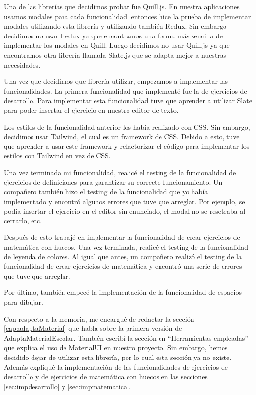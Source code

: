 Una de las librerías que decidimos probar fue Quill.js. En nuestra aplicaciones usamos modales para cada funcionalidad, entonces hice la prueba de implementar modales utilizando esta librería y utilizando también Redux. Sin embargo decidimos no usar Redux ya que encontramos una forma más sencilla de implementar los modales en Quill. Luego decidimos no usar Quill.js ya que encontramos otra librería llamada Slate.js que se adapta mejor a nuestras necesidades.

Una vez que decidimos que librería utilizar, empezamos a implementar las funcionalidades. La primera funcionalidad que implementé fue la de ejercicios de desarrollo. Para implementar esta funcionalidad tuve que aprender a utilizar Slate para poder insertar el ejercicio en nuestro editor de texto.

Los estilos de la funcionalidad anterior los había realizado con CSS. Sin embargo, decidimos usar Tailwind, el cual es un framework de CSS. Debido a esto, tuve que aprender a usar este framework y refactorizar el código para implementar los estilos con Tailwind en vez de CSS.

Una vez terminada mi funcionalidad, realicé el testing de la funcionalidad de ejercicios de definiciones para garantizar su correcto funcionamiento. Un compañero también hizo el testing de la funcionalidad que yo había implementado y encontró algunos errores que tuve que arreglar. Por ejemplo, se podía insertar el ejercicio en el editor sin enunciado, el modal no se reseteaba al cerrarlo, etc.

Después de esto trabajé en implementar la funcionalidad de crear ejercicios de matemática con huecos. Una vez terminada, realicé el testing de la funcionalidad de leyenda de colores. Al igual que antes, un compañero realizó el testing de la funcionalidad de crear ejercicios de matemática y encontró una serie de errores que tuve que arreglar.

Por último, también empecé la implementación de la funcionalidad de espacios para dibujar.

Con respecto a la memoria, me encargué de redactar la sección \ref{cap:adaptaMaterial} que habla sobre la primera versión de AdaptaMaterialEscolar. También escribí la sección en “Herramientas empleadas” que explica el uso de MaterialUI en nuestro proyecto. Sin embargo, hemos decidido dejar de utilizar esta librería, por lo cual esta sección ya no existe. Además expliqué la implementación de las funcionalidades de ejercicios de desarrollo y de ejercicios de matemática con huecos en las secciones \ref{sec:impdesarrollo} y \ref{sec:impmatematica}.

